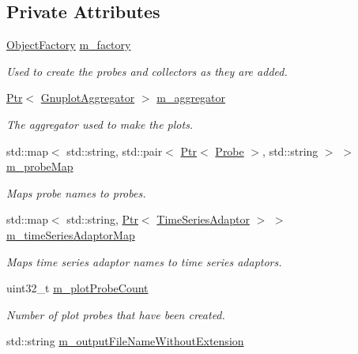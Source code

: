\subsection*{Private Attributes}
\begin{DoxyCompactItemize}
\item 
\hyperlink{classns3_1_1ObjectFactory}{Object\+Factory} \hyperlink{classns3_1_1GnuplotHelper_ac04d61e2ed2cd2f3bcc6669114cbbb53}{m\+\_\+factory}
\begin{DoxyCompactList}\small\item\em Used to create the probes and collectors as they are added. \end{DoxyCompactList}\item 
\hyperlink{classns3_1_1Ptr}{Ptr}$<$ \hyperlink{classns3_1_1GnuplotAggregator}{Gnuplot\+Aggregator} $>$ \hyperlink{classns3_1_1GnuplotHelper_a41e45ec3d599db99d791512e60a10c35}{m\+\_\+aggregator}
\begin{DoxyCompactList}\small\item\em The aggregator used to make the plots. \end{DoxyCompactList}\item 
std\+::map$<$ std\+::string, std\+::pair$<$ \hyperlink{classns3_1_1Ptr}{Ptr}$<$ \hyperlink{classns3_1_1Probe}{Probe} $>$, std\+::string $>$ $>$ \hyperlink{classns3_1_1GnuplotHelper_aa4e50b82ac09e3ec99c1881f37f12ca5}{m\+\_\+probe\+Map}
\begin{DoxyCompactList}\small\item\em Maps probe names to probes. \end{DoxyCompactList}\item 
std\+::map$<$ std\+::string, \hyperlink{classns3_1_1Ptr}{Ptr}$<$ \hyperlink{classns3_1_1TimeSeriesAdaptor}{Time\+Series\+Adaptor} $>$ $>$ \hyperlink{classns3_1_1GnuplotHelper_ad013691ac007d20ac6c04261dda2432a}{m\+\_\+time\+Series\+Adaptor\+Map}
\begin{DoxyCompactList}\small\item\em Maps time series adaptor names to time series adaptors. \end{DoxyCompactList}\item 
uint32\+\_\+t \hyperlink{classns3_1_1GnuplotHelper_ab674c88bf8c395e601007ecb39b65dbf}{m\+\_\+plot\+Probe\+Count}
\begin{DoxyCompactList}\small\item\em Number of plot probes that have been created. \end{DoxyCompactList}\item 
std\+::string \hyperlink{classns3_1_1GnuplotHelper_ab42930fa6681380e5b28d87326392cb4}{m\+\_\+output\+File\+Name\+Without\+Extension}

\end{DoxyCompactItemize}
